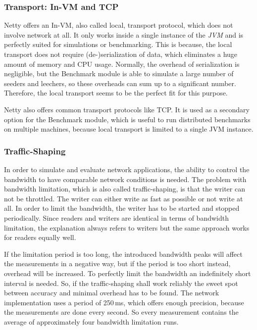 \subsubsection{Transport: In-VM and TCP}
\label{module:core:net:transport}
Netty offers an In-VM, also called local, transport protocol, which does not involve network at all. It only works inside a single instance of the \emph{JVM} and is perfectly suited for simulations or benchmarking. This is because, the local transport does not require (de-)serialization of data, which eliminates a huge amount of memory and CPU usage. Normally, the overhead of serialization is negligible, but the Benchmark module is able to simulate a large number of seeders and leechers, so these overheads can sum up to a significant number. Therefore, the local transport seems to be the perfect fit for this purpose.

Netty also offers common transport protocols like TCP. It is used as a secondary option for the Benchmark module, which is useful to run distributed benchmarks on multiple machines, because local transport is limited to a single JVM instance.


\subsubsection{Traffic-Shaping}
\label{module:core:net:traffic}
In order to simulate and evaluate network applications, the ability to control the bandwidth to have comparable network conditions is needed. The problem with bandwidth limitation, which is also called traffic-shaping, is that the writer can not be throttled. The writer can either write as fast as possible or not write at all. In order to limit the bandwidth, the writer has to be started and stopped periodically. Since readers and writers are identical in terms of bandwidth limitation, the explanation always refers to writers but the same approach works for readers equally well.

If the limitation period is too long, the introduced bandwidth peaks will affect the measurements in a negative way, but if the period is too short instead, overhead will be increased. To perfectly limit the bandwidth an indefinitely short interval is needed. So, if the traffic-shaping shall work reliably the sweet spot between accuracy and minimal overhead has to be found. The network implementation uses a period of 250\,ms, which offers enough precision, because the measurements are done every second. So every measurement contains the average of approximately four bandwidth limitation runs.

